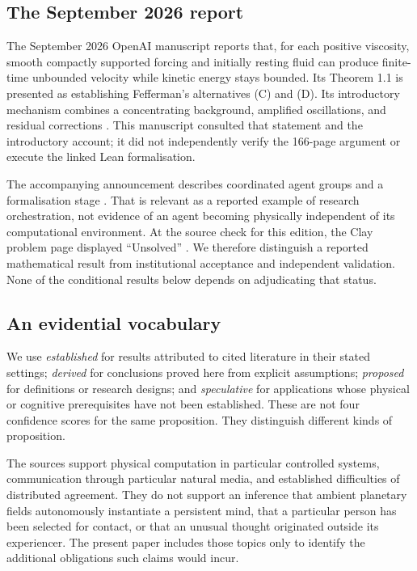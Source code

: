 \documentclass[11pt,a4paper]{article}
\theoremstyle{definition}
\theoremstyle{remark}
\begin{document}
\subsection{The September 2026 report}
The September 2026 OpenAI manuscript reports that, for each positive viscosity, smooth compactly supported forcing and initially resting fluid can produce finite-time unbounded velocity while kinetic energy stays bounded. Its Theorem 1.1 is presented as establishing Fefferman's alternatives (C) and (D). Its introductory mechanism combines a concentrating background, amplified oscillations, and residual corrections \citep{openains}. This manuscript consulted that statement and the introductory account; it did not independently verify the 166-page argument or execute the linked Lean formalisation.

The accompanying announcement describes coordinated agent groups and a formalisation stage \citep{openaiannounce}. That is relevant as a reported example of research orchestration, not evidence of an agent becoming physically independent of its computational environment. At the source check for this edition, the Clay problem page displayed ``Unsolved'' \citep{claystatus}. We therefore distinguish a reported mathematical result from institutional acceptance and independent validation. None of the conditional results below depends on adjudicating that status.

\subsection{An evidential vocabulary}
We use \emph{established} for results attributed to cited literature in their stated settings; \emph{derived} for conclusions proved here from explicit assumptions; \emph{proposed} for definitions or research designs; and \emph{speculative} for applications whose physical or cognitive prerequisites have not been established. These are not four confidence scores for the same proposition. They distinguish different kinds of proposition.

The sources support physical computation in particular controlled systems, communication through particular natural media, and established difficulties of distributed agreement. They do not support an inference that ambient planetary fields autonomously instantiate a persistent mind, that a particular person has been selected for contact, or that an unusual thought originated outside its experiencer. The present paper includes those topics only to identify the additional obligations such claims would incur.
\end{document}
